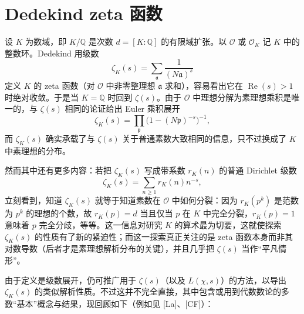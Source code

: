 \section{Dedekind zeta 函数}\label{sec:4}

设 $K$ 为数域，即 $K/\mathbb{Q}$ 是次数 $d=[K:\mathbb{Q}]$ 的有限域扩张。以 $\mathcal{O}$ 或 $\mathcal{O}_K$ 记 $K$ 中的整数环。Dedekind 用级数
\[
\zeta_K(s)=\sum_{\mathfrak{a}}\frac{1}{(N\mathfrak{a})^{s}}
\]
定义 $K$ 的 zeta 函数（对 $\mathcal{O}$ 中非零整理想 $\mathfrak{a}$ 求和），容易看出它在 $\operatorname{Re}(s)>1$ 时绝对收敛。于是当 $K=\mathbb{Q}$ 时回到 $\zeta(s)$。由于 $\mathcal{O}$ 中理想分解为素理想乘积是唯一的，与 $\zeta(s)$ 相同的论证给出 Euler 乘积展开
\[
\zeta_K(s)=\prod_{\mathfrak{p}}\bigl(1-(N\mathfrak{p})^{-s}\bigr)^{-1},
\]
而 $\zeta_K(s)$ 确实承载了与 $\zeta(s)$ 关于普通素数大致相同的信息，只不过换成了 $K$ 中素理想的分布。

然而其中还有更多内容：若把 $\zeta_K(s)$ 写成带系数 $r_K(n)$ 的普通 Dirichlet 级数
\begin{equation}\tag{4.1}\label{eq:4.1}
\zeta_K(s)=\sum_{n\ge 1}r_K(n)n^{-s},
\end{equation}
立刻看到，知道 $\zeta_K(s)$ 就等于知道素数在 $\mathcal{O}$ 中如何分裂：因为 $r_K(p^{k})$ 是范数为 $p^{k}$ 的理想的个数，故 $r_K(p)=d$ 当且仅当 $p$ 在 $K$ 中完全分裂，$r_K(p)=1$ 意味着 $p$ 完全分歧，等等。这一信息对研究 $K$ 的算术最为切要，这就使探索 $\zeta_K(s)$ 的性质有了新的紧迫性；而这一探索真正关注的是 zeta 函数本身而非其对数导数（后者才是素理想解析分布的关键），并且几乎把 $\zeta(s)$ 当作“平凡情形”。

由于定义是级数展开，仍可推广用于 $\zeta(s)$（以及 $L(\chi,s)$）的方法，以导出 $\zeta_K(s)$ 的类似解析性质。不过这并不完全直接，其中包含或用到代数数论的多数“基本”概念与结果，现回顾如下（例如见 [La]、[CF]）：

